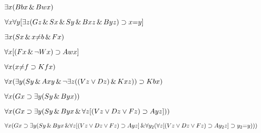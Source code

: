 \begin{earg}
\item $\exists x (Bbx \,\&\, Bwx)$ %
\item $\forall x \forall y [\exists z (Gz \,\&\, Sx \,\&\, Sy \,\&\, Bxz \,\&\, Byz) \supset x{=}y]$ %
\item $\exists x (Sx \,\&\, x{\neq}b \,\&\, Fx)$ %
\item $\forall x [(Fx \,\&\, \neg Wx) \supset Awx]$ %
\item $\forall x (x{\neq}f \supset Kfx)$ %
\item $\forall x (\exists y (Sy \,\&\, Axy \,\&\, \neg \exists z ((Vz \vee Dz) \,\&\, Kxz)) \supset Kbx)$ %
\item $\forall x (Gx \supset \exists y (Sy \,\&\, Byx))$ %
\item $\forall x (Gx \supset \exists y (Sy \,\&\, Byx \,\&\, \forall z [(Vz \vee Dz \vee Fz) \supset Ayz]))$ %
\item $\forall x (Gx \supset \exists y (Sy \,\&\, Byx \,\&\, \\ 
\forall z [(Vz \vee Dz \vee Fz) \supset Ayz] \,\&\, \\ 
	\forall y_{2} (\forall z [(Vz \vee Dz \vee Fz) \supset Ay_{2}z] \supset y_{2}{=}y) ))$ %
\end{earg}


